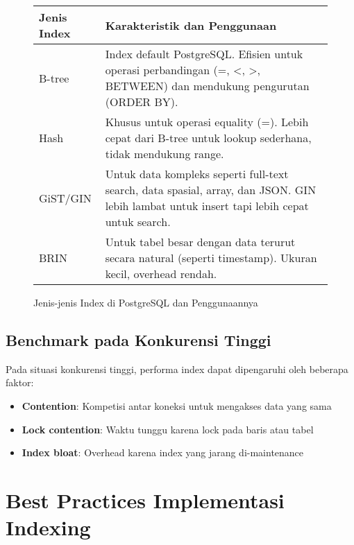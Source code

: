 \begin{figure}[h]
	\centering
	\begin{tabular}{|l|p{10cm}|}
		\hline
		\textbf{Jenis Index} & \textbf{Karakteristik dan Penggunaan} \\
		\hline
		B-tree & Index default PostgreSQL. Efisien untuk operasi perbandingan (=, <, >, BETWEEN) dan mendukung pengurutan (ORDER BY). \\
		\hline
		Hash & Khusus untuk operasi equality (=). Lebih cepat dari B-tree untuk lookup sederhana, tidak mendukung range. \\
		\hline
		GiST/GIN & Untuk data kompleks seperti full-text search, data spasial, array, dan JSON. GIN lebih lambat untuk insert tapi lebih cepat untuk search. \\
		\hline
		BRIN & Untuk tabel besar dengan data terurut secara natural (seperti timestamp). Ukuran kecil, overhead rendah. \\
		\hline
	\end{tabular}
	\caption{Jenis-jenis Index di PostgreSQL dan Penggunaannya}
\end{figure}

\subsection{Benchmark pada Konkurensi Tinggi}

Pada situasi konkurensi tinggi, performa index dapat dipengaruhi oleh beberapa faktor:

\begin{itemize}
    \item \textbf{Contention}: Kompetisi antar koneksi untuk mengakses data yang sama
    \item \textbf{Lock contention}: Waktu tunggu karena lock pada baris atau tabel
    \item \textbf{Index bloat}: Overhead karena index yang jarang di-maintenance
\end{itemize}

\section{Best Practices Implementasi Indexing}

